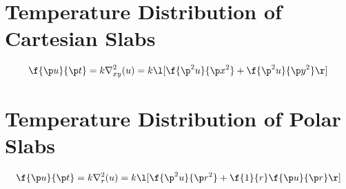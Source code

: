 \chapter{Temperature Distribution of Cartesian Slabs}
\begin{comment}
Physics Archives
\end{comment}
$$\f{\p u}{\p t} = k\nabla^2_{xy}(u) = k\l[\f{\p^2 u}{\p x^2} + \f{\p^2 u}{\p y^2}\r]$$
\chapter{Temperature Distribution of Polar Slabs}
\begin{comment}
Physics Archives
\end{comment}
$$\f{\p u}{\p t} = k\nabla^2_{r}(u) = k\l[\f{\p^2 u}{\p r^2} + \f{1}{r}\f{\p u}{\p r}\r]$$
